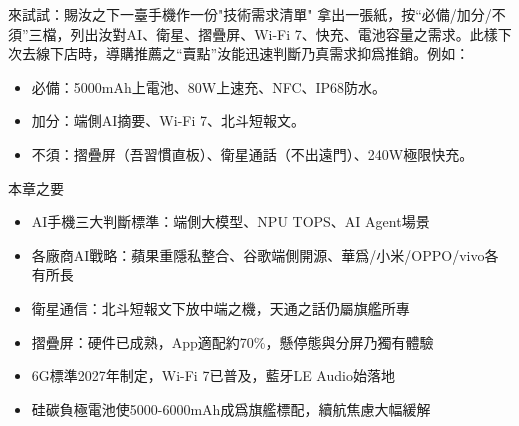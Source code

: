 \begin{tcbpractice}{來試試：賜汝之下一臺手機作一份"技術需求清單"}
拿出一張紙，按“必備/加分/不須”三檔，列出汝對AI、衛星、摺疊屏、Wi-Fi 7、快充、電池容量之需求。此樣下次去線下店時，導購推薦之“賣點”汝能迅速判斷乃真需求抑爲推銷。例如：

\begin{itemize}
  \item 必備：5000mAh上電池、80W上速充、NFC、IP68防水。
  \item 加分：端側AI摘要、Wi-Fi 7、北斗短報文。
  \item 不須：摺疊屏（吾習慣直板）、衛星通話（不出遠門）、240W極限快充。
\end{itemize}

\end{tcbpractice}

\begin{tcbsummary}{本章之要}
\begin{itemize}
  \item AI手機三大判斷標準：端側大模型、NPU TOPS、AI Agent場景
  \item 各廠商AI戰略：蘋果重隱私整合、谷歌端側開源、華爲/小米/OPPO/vivo各有所長
  \item 衛星通信：北斗短報文下放中端之機，天通之話仍屬旗艦所專
  \item 摺疊屏：硬件已成熟，App適配約70\%，懸停態與分屏乃獨有體驗
  \item 6G標準2027年制定，Wi-Fi 7已普及，藍牙LE Audio始落地
  \item 硅碳負極電池使5000-6000mAh成爲旗艦標配，續航焦慮大幅緩解
\end{itemize}

\end{tcbsummary}
